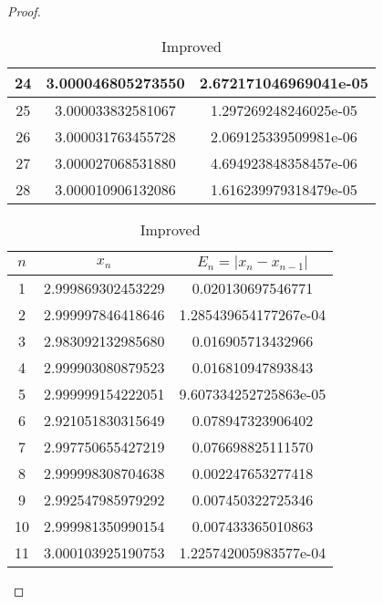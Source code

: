 \begin{enumerate}
\begin{proof}
\begin{table}[H]
\begin{subtable}[t]{.8\textwidth}
\begin{table}[H]
\begin{subtable}[t]{.8\textwidth}
\begin{table}[htbp]
\begin{subtable}[t]{.49\linewidth}
\begin{tabular}{|c|c|c|}
			\footnotesize	24	&	\footnotesize	3.000046805273550	&	\footnotesize	2.672171046969041e-05	\\	\hline
			\footnotesize	25	&	\footnotesize	3.000033832581067	&	\footnotesize	1.297269248246025e-05	\\	\hline
			\footnotesize	26	&	\footnotesize	3.000031763455728	&	\footnotesize	2.069125339509981e-06	\\	\hline
			\footnotesize	27	&	\footnotesize	3.000027068531880	&	\footnotesize	4.694923848358457e-06	\\	\hline
			\footnotesize	28	&	\footnotesize	3.000010906132086	&	\footnotesize	1.616239979318479e-05	\\	\hline
			\end{tabular}
		\end{subtable}
		\ifnum{}
			\begin{subtable}[t]{.8\textwidth}
			\centering
			\caption{Improved}
			\begin{tabular}{|c|c|c|}
				\hline
				$n$		&		\(x_n\)				&	\(E_n=|x_n-x_{n-1}|\)	\\	\hline
				\footnotesize	1	&	\footnotesize	2.999869302453229	&	\footnotesize	0.020130697546771	\\	\hline
				\footnotesize	2	&	\footnotesize	2.999997846418646	&	\footnotesize	1.285439654177267e-04	\\	\hline
				\footnotesize	3	&	\footnotesize	2.983092132985680	&	\footnotesize	0.016905713432966	\\	\hline
				\footnotesize	4	&	\footnotesize	2.999903080879523	&	\footnotesize	0.016810947893843	\\	\hline
				\footnotesize	5	&	\footnotesize	2.999999154222051	&	\footnotesize	9.607334252725863e-05	\\	\hline
				\footnotesize	6	&	\footnotesize	2.921051830315649	&	\footnotesize	0.078947323906402	\\	\hline
				\footnotesize	7	&	\footnotesize	2.997750655427219	&	\footnotesize	0.076698825111570	\\	\hline
				\footnotesize	8	&	\footnotesize	2.999998308704638	&	\footnotesize	0.002247653277418	\\	\hline
				\footnotesize	9	&	\footnotesize	2.992547985979292	&	\footnotesize	0.007450322725346	\\	\hline
				\footnotesize	10	&	\footnotesize	2.999981350990154	&	\footnotesize	0.007433365010863	\\	\hline
				\footnotesize	11	&	\footnotesize	3.000103925190753	&	\footnotesize	1.225742005983577e-04	\\	\hline

\end{tabular}
\end{subtable}
\end{table}
\end{subtable}
\end{table}
\end{subtable}
\end{table}
\end{proof}
\end{enumerate}
